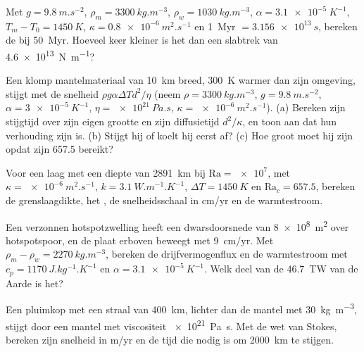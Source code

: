 \begin{exercise}[$\star$]\label{exo:b3:mantle-convection:4}
Met $g = \qty{9.8}{m.s^{-2}}$, $\rho_m = \qty{3300}{kg.m^{-3}}$, $\rho_w =
\qty{1030}{kg.m^{-3}}$, $\alpha = \qty{3.1e-5}{K^{-1}}$, $T_m - T_0 =
\qty{1450}{K}$, $\kappa = \qty{0.8e-6}{m^2.s^{-1}}$ en \qty{1}{Myr} $=
\qty{3.156e13}{s}$, bereken de  bij \qty{50}{Myr}. Hoeveel
keer kleiner is het dan een slabtrek van \qty{4.6e13}{N.m^{-1}}?
\end{exercise}

\begin{exercise}[$\star\star$]\label{exo:b3:mantle-convection:5}
Een klomp mantelmateriaal van \qty{10}{km} breed, \qty{300}{K} warmer dan zijn
omgeving, stijgt met de snelheid $\rho g\alpha\Delta Td^2/\eta$ (neem $\rho =
\qty{3300}{kg.m^{-3}}$, $g = \qty{9.8}{m.s^{-2}}$, $\alpha = \qty{3e-5}{K^{-1}}$,
$\eta = \qty{e21}{Pa.s}$, $\kappa = \qty{e-6}{m^2.s^{-1}}$). (a) Bereken zijn
stijgtijd over zijn eigen grootte en zijn diffusietijd $d^2/\kappa$, en toon aan dat hun
verhouding zijn  is. (b) Stijgt hij of koelt hij eerst af? (c)
Hoe groot moet hij zijn opdat zijn  657.5 bereikt?
\end{exercise}

\begin{exercise}[$\star\star$]\label{exo:b3:mantle-convection:6}
Voor een laag met een diepte van \qty{2891}{km} bij $\mathrm{Ra} = \num{e7}$, met $\kappa =
\qty{e-6}{m^2.s^{-1}}$, $k = \qty{3.1}{W.m^{-1}.K^{-1}}$, $\Delta T =
\qty{1450}{K}$ en $\mathrm{Ra}_c = 657.5$, bereken de
grenslaagdikte, het , de snelheidsschaal in \unit{cm/yr} en de
warmtestroom.
\end{exercise}

\begin{exercise}[$\star\star$]\label{exo:b3:mantle-convection:7}
Een verzonnen hotspotzwelling heeft een dwarsdoorsnede van \qty{8e8}{m^2} over
hotspotspoor, en de plaat erboven beweegt met \qty{9}{cm/yr}. Met $\rho_m - \rho_w =
\qty{2270}{kg.m^{-3}}$, bereken de drijfvermogenflux en de warmtestroom met $c_p =
\qty{1170}{J.kg^{-1}.K^{-1}}$ en $\alpha = \qty{3.1e-5}{K^{-1}}$. Welk deel
van de \qty{46.7}{TW} van de Aarde is het?
\end{exercise}

\begin{exercise}[$\star\star$]\label{exo:b3:mantle-convection:8}
Een pluimkop met een straal van \qty{400}{km}, lichter dan de mantel met
\qty{30}{kg.m^{-3}}, stijgt door een mantel met viscositeit \qty{e21}{Pa.s}. Met
de wet van Stokes, bereken zijn snelheid in \unit{m/yr} en de tijd die nodig is om
\qty{2000}{km} te stijgen.
\end{exercise}

